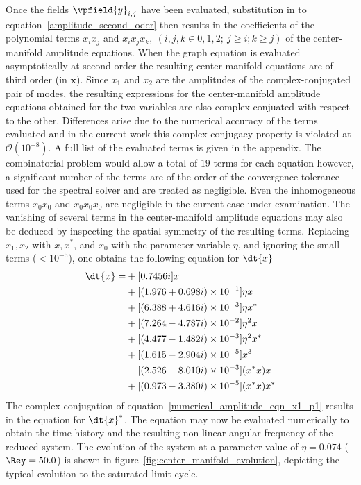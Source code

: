 Once the fields $\vpfield{y}_{i,j}$ have been evaluated, substitution in to equation~\eqref{amplitude_second_oder} then results in the coefficients of the polynomial terms $x_{i}x_{j}$ and $x_{i}x_{j}x_{k}, \ (i,j,k \in 0,1,2;\ j\ge i; k\ge j)$ of the center-manifold amplitude equations. When the graph equation is evaluated asymptotically at second order the resulting center-manifold equations are of third order (in $\mathbf{x}$). Since $x_{1}$ and $x_{2}$ are the amplitudes of the complex-conjugated pair of modes, the resulting expressions for the center-manifold amplitude equations obtained for the two variables are also complex-conjuated with respect to the other. Differences arise due to the numerical accuracy of the terms evaluated and in the current work this complex-conjugacy property is violated at $\mathcal{O}(10^{-8})$. A full list of the evaluated terms is given in the appendix. The combinatorial problem would allow a total of $19$ terms for each equation however, a significant number of the terms are of the order of the convergence tolerance used for the spectral solver and are treated as negligible. Even the inhomogeneous terms $x_{0}x_{0}$ and $x_{0}x_{0}x_{0}$ are negligible in the current case under examination. The vanishing of several terms in the center-manifold amplitude equations may also be deduced by inspecting the spatial symmetry of the resulting terms. Replacing $x_{1},x_{2}$ with $x,x^{*}$, and $x_{0}$ with the parameter variable $\eta$, and ignoring the small terms ($<10^{-5}$), one obtains the following equation for $\dt{x}$
\begin{equation}
	\label{numerical_amplitude_eqn_x1_p1}
	\begin{aligned}
			\dt{x} =& +[0.7456i]x \\
			& + [(1.976 + 0.698i)\times10^{-1}]\eta x \\ 
			& + [(6.388 + 4.616i)\times10^{-3}]\eta x^{*}  \\
			& + [(7.264 - 4.787i)\times10^{-2}]\eta^{2} x \\
			& + [(4.477 - 1.482i)\times10^{-3}]\eta^{2}x^{*} \\
			& + [(1.615 - 2.904i)\times10^{-5}]x^{3}  \\
			& - [(2.526 - 8.010i)\times10^{-3}](x^{*}x)x \\
			& + [(0.973 - 3.380i)\times10^{-5}](x^{*}x)x^{*} \\
		\end{aligned}
\end{equation}
The complex conjugation of equation~\eqref{numerical_amplitude_eqn_x1_p1} results in the equation for $\dt{x}^{*}$. The equation may now be evaluated numerically to obtain the time history and the resulting non-linear angular frequency of the reduced system. The evolution of the system at a parameter value of $\eta=0.074$ ($\Rey=50.0$) is shown in figure~\ref{fig:center_manifold_evolution}, depicting the typical evolution to the saturated limit cycle. 
